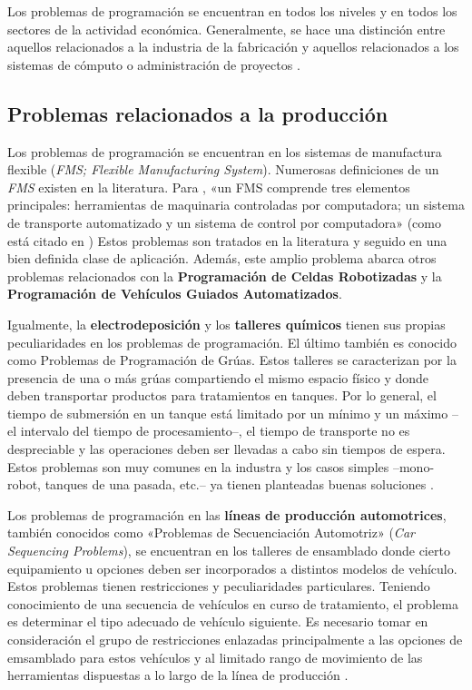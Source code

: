 \documentclass[spanish,draft,12pt,headsepline,footsepline,paper=letter]{scrreprt}
\begin{document}
Los problemas de programación se encuentran en todos los niveles y en todos los sectores de la actividad económica. Generalmente, se hace una distinción entre aquellos relacionados a la industria de la fabricación y aquellos relacionados a los sistemas de cómputo o administración de proyectos \citep[p.~6]{TKindt2002}.

\subsection{Problemas relacionados a la producción} %
\label{problemas_relacionados_produccion}

Los problemas de programación se encuentran en los sistemas de manufactura flexible (\textit{FMS; Flexible Manufacturing System}). Numerosas definiciones de un \textit{FMS} existen en la literatura. Para \citet{liu1996classification}, «un FMS comprende tres elementos principales: herramientas de maquinaria controladas por computadora; un sistema de transporte automatizado y un sistema de control por computadora» (como está citado en \citealp[p.~6]{TKindt2002})  Estos problemas son tratados en la literatura y seguido en una bien definida clase de aplicación. Además, este amplio problema abarca otros problemas relacionados con la \textbf{Programación de Celdas Robotizadas} y la \textbf{Programación de Vehículos Guiados Automatizados}.

Igualmente, la \textbf{electrodeposición} y los \textbf{talleres químicos} tienen sus propias peculiaridades en los problemas de programación. El último también es conocido como Problemas de Programación de Grúas. Estos talleres se caracterizan por la presencia de una o más grúas compartiendo el mismo espacio físico y donde deben transportar productos para tratamientos en tanques. Por lo general, el tiempo de submersión en un tanque está limitado por un mínimo y un máximo –el intervalo del tiempo de procesamiento–, el tiempo de transporte no es despreciable y las operaciones deben ser llevadas a cabo sin tiempos de espera. Estos problemas son muy comunes en la industra y los casos simples –mono-robot, tanques de una pasada, etc.– ya tienen planteadas buenas soluciones \citep[p.~6,~7]{TKindt2002}.

Los problemas de programación en las \textbf{líneas de producción automotrices}, también conocidos como «Problemas de Secuenciación Automotriz» (\textit{Car Sequencing Problems}), se encuentran en los talleres de ensamblado donde cierto equipamiento u opciones deben ser incorporados a distintos modelos de vehículo. Estos problemas tienen restricciones y peculiaridades particulares. Teniendo conocimiento de una secuencia de vehículos en curso de tratamiento, el problema es determinar el tipo adecuado de vehículo siguiente. Es necesario tomar en consideración el grupo de restricciones enlazadas principalmente a las opciones de emsamblado para estos vehículos y al limitado rango de movimiento de las herramientas dispuestas a lo largo de la línea de producción \citep[p.~7]{TKindt2002}.
\end{document}

